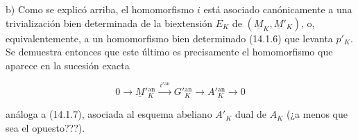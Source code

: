\smallskip
\noindent
b) Como se explicó arriba, el homomorfismo $i$ está asociado
canónicamente a una trivialización bien determinada de la biextensión
$E_K$ de $(\underline M_K,\underline M'_K)$, o, equivalentemente, a un
homomorfismo bien determinado (14.1.6) que levanta $p'_K$. Se demuestra
entonces que este último es precisamente el homomorfismo que aparece en
la sucesión exacta

\begin{equation}\tag{14.1.13}
 0\longrightarrow\underline M'{}^{\mathrm{an}}_K
 \xrightarrow{\ i'{}^{\mathrm{an}}\ }G'{}^{\mathrm{an}}_K
 \longrightarrow A'{}^{\mathrm{an}}_K\longrightarrow0
\end{equation}

\noindent
análoga a (14.1.7), asociada al esquema abeliano $A'_K$ dual de $A_K$
(¿a menos que sea el opuesto???).
